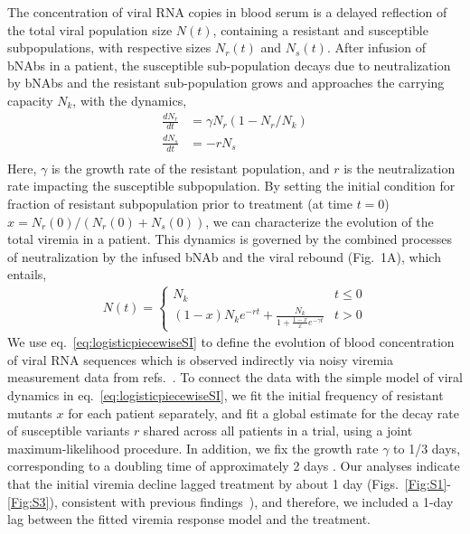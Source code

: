 \documentclass[11pt]{article}
\begin{document}
The concentration of viral RNA copies in blood serum is a delayed reflection of the total viral population size $N(t)$, containing a resistant and susceptible subpopulations, with respective sizes $N_r(t)$ and $N_s(t)$. 
After infusion of bNAbs in a patient, the susceptible sub-population decays due to neutralization by bNAbs and the resistant sub-population grows and approaches the carrying capacity $N_k$, with the dynamics,  
		\begin{align}
\nonumber \frac{d N_r }{d t} &= \gamma N_r (1- N_r/N_k)\\
\nonumber \frac{d N_s }{d t} &= -r N_s\\
\label{eq:rebounddynamics}
\end{align}
Here, $\gamma$ is the growth rate of the resistant population, and $r$ is the neutralization rate impacting the susceptible subpopulation. By setting the initial condition for fraction of resistant subpopulation prior to treatment  (at time $t=0$) $x=  N_r(0)/ (N_r(0) + N_s (0))$, we can characterize the evolution of the total viremia in a patient. This dynamics is governed  by the combined processes of neutralization by the infused bNAb and the viral rebound (Fig.~1A), which entails,
\begin{align}
\label{eq:logisticpiecewiseSI}
N(t) = 
\begin{cases}
N_k 
	& t \leq 0 \\
(1-x) N_k e^{-r t} + \frac{N_k}{1+ \frac{1-x}{x}e^{- \gamma t}}
	& t>0
\end{cases}
\end{align}
We use eq.~\ref{eq:logisticpiecewiseSI} to define the evolution of blood concentration of viral RNA sequences which is observed indirectly via noisy viremia measurement data from refs.~\cite{Caskey:2015hm,Caskey:2017el,bar-onSafetyAntiviralActivity2018}.
To connect the data with the simple model of viral dynamics  in eq.~\ref{eq:logisticpiecewiseSI}, we  fit the initial frequency of resistant mutants $x$ for each patient separately, and fit a global estimate  for  the decay rate of susceptible variants $r$ shared across all patients in a trial, using a joint maximum-likelihood procedure. In addition, we fix the  growth rate $\gamma$ to 1/3 days, corresponding to a doubling time of approximately 2 days \cite{garciaDynamicsViralLoad1999}.
 Our analyses indicate that the initial viremia decline lagged treatment by about 1 day (Figs.~\ref{Fig:S1}-\ref{Fig:S3}),  consistent with previous findings~\cite{ioannidisDynamicsHIV1Viral2000}), and  therefore, we included a 1-day lag between the fitted viremia response model and the treatment.
\end{document}
